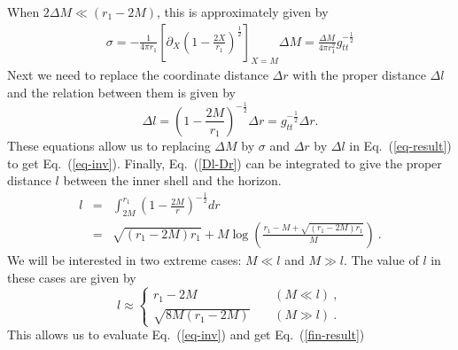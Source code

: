 \documentclass[aps,showpacs,onecolumn,floats,prd,superscriptaddress,nofootinbib]{revtex4-1}
\begin{document}
When $2\Delta M \ll (r_1-2M)$, this is approximately given by 
\begin{eqnarray}
	\sigma  =  -\frac{1}{4 \pi r_1} \left[ \partial_X \left( 1 - \frac{2X}{r_1} \right)^\frac{1}{2} \right]_{X = M} \Delta M
	 =  \frac{\Delta M}{4 \pi r_1^2} g_{tt}^{-\frac{1}{2}}	\label{sig-Dm}
\end{eqnarray}
Next we need to replace the coordinate distance $\Delta r$ with the proper distance $\Delta l$ and the relation between them is given by
\begin{equation}
	\Delta l = \left( 1 - \frac{2M}{r_1} \right)^{-\frac{1}{2}} \Delta r = g_{tt}^{-\frac{1}{2}} \Delta r.	\label{Dl-Dr}
\end{equation}
These equations allow us to replacing $\Delta M$ by $\sigma$ and $\Delta r$ by $\Delta l$ in Eq.~(\ref{eq-result}) to get Eq.~(\ref{eq-inv}). Finally, Eq.~(\ref{Dl-Dr}) can be integrated to give the proper distance $l$ between the inner shell and the horizon.
\begin{eqnarray}
	l & = & \int^{r_1}_{2M} \left( 1 - \frac{2M}{r} \right)^{-\frac{1}{2}} dr	\nonumber	\\
	& = & \sqrt{(r_1 - 2M)r_1} + M \log \left( \frac{ r_1 - M + \sqrt{(r_1 - 2M)r_1}}{M} \right)	~.
	\label{l-r}
\end{eqnarray}
We will be interested in two extreme cases: $M \ll l$ and $M \gg l$. The value of $l$ in these cases are given by
\begin{equation}
l \approx \begin{cases}
 r_1 - 2M & \ \ \ \ \ (M \ll l)~,	\\
 \sqrt{8M(r_1 - 2M)} & \ \ \ \ \ (M \gg l)~.
\end{cases}	
\end{equation}
This allows us to evaluate Eq.~(\ref{eq-inv}) and get Eq.~(\ref{fin-result})
\end{document}
